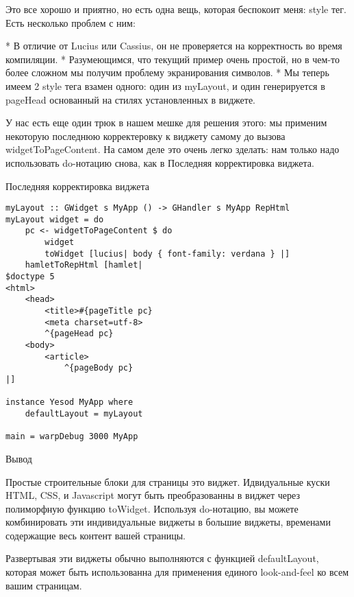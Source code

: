 Это все хорошо и приятно, но есть одна вещь, которая беспокоит меня: style тег. Есть несколько проблем с ним:

* В отличие от Lucius или Cassius, он не проверяется на корректность во время компиляции.
* Разумеющимся, что текущий пример очень простой, но в чем-то более сложном мы получим проблему экранирования символов.
* Мы теперь имеем 2 style тега взамен одного: один из myLayout, и один генерируется в pageHead основанный на стилях установленных в виджете.

У нас есть еще один трюк в нашем мешке для решения этого: мы применим некоторую последнюю корректеровку к виджету самому до вызова widgetToPageContent. На самом деле это очень легко зделать: нам только надо использовать do-нотацию снова, как в Последняя корректировка виджета.

Последняя корректировка виджета

\begin{lstlisting}
myLayout :: GWidget s MyApp () -> GHandler s MyApp RepHtml
myLayout widget = do
    pc <- widgetToPageContent $ do
        widget
        toWidget [lucius| body { font-family: verdana } |]
    hamletToRepHtml [hamlet|
$doctype 5
<html>
    <head>
        <title>#{pageTitle pc}
        <meta charset=utf-8>
        ^{pageHead pc}
    <body>
        <article>
            ^{pageBody pc}
|]

instance Yesod MyApp where
    defaultLayout = myLayout

main = warpDebug 3000 MyApp
\end{lstlisting}

Вывод

Простые строительные блоки для страницы это виджет. Идвидуальные куски HTML, CSS, и Javascript могут быть преобразованны в виджет через полиморфную функцию toWidget. Используя do-нотацию, вы можете комбинировать эти индивидуальные виджеты в большие виджеты, временами содержащие весь контент вашей страницы.

Развертывая эти виджеты обычно выполняются с функцией defaultLayout, которая может быть использованна для применения единого look-and-feel ко всем вашим страницам.